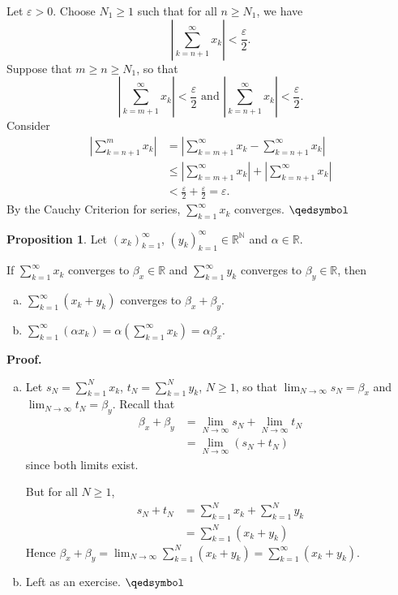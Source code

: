 \documentclass[11pt]{article}
\theoremstyle{definition}
\newtheorem{prop}[thm]{Proposition}
\newcommand{\mbN}{\ensuremath{\mathbb{N}}}
\newcommand{\mbR}{\ensuremath{\mathbb{R}}}
\begin{document}
Let $\varepsilon > 0$. Choose $N_1 \geq 1$ such that for all $n \geq N_1$, we have
$$\left| \sum_{k=n+1}^\infty x_k\right| < \frac{\varepsilon}2 \text{.}$$
Suppose that $m \geq n \geq N_1$, so that
$$\left|\sum_{k=m+1}^\infty x_k \right| < \frac{\varepsilon}2 \text{ and } \left|\sum_{k=n+1}^\infty x_k\right| < \frac{\varepsilon}2 \text{.}$$
Consider
\begin{align*}
\left| \sum_{k=n+1}^m x_k\right| 
& = \left|\sum_{k=m+1}^\infty x_k - \sum_{k=n+1}^\infty x_k\right| \\
& \leq \left|\sum_{k=m+1}^\infty x_k\right| + \left|\sum_{k=n+1}^\infty x_k\right| \\
& < \frac{\varepsilon}2 + \frac{\varepsilon}2 = \varepsilon \text{.}
\end{align*}
By the Cauchy Criterion for series, $\sum_{k=1}^\infty x_k$ converges. $\qedsymbol$

\begin{prop}
Let $(x_k)_{k=1}^\infty$, $(y_k)_{k=1}^\infty \in \mbR^{\mbN}$ and $\alpha \in \mbR$. 

If $\sum_{k=1}^\infty x_k$ converges to $\beta_x \in \mbR$ and $\sum_{k=1}^\infty y_k$ converges to $\beta_y \in \mbR$, then
\begin{enumerate}[(a)] \vspace{-0.2cm}
\item $\sum_{k=1}^\infty (x_k + y_k)$ converges to $\beta_x + \beta_y$. 
\item $\sum_{k=1}^\infty (\alpha x_k) = \alpha \left(\sum_{k=1}^\infty x_k\right) = \alpha \beta_x$.
\end{enumerate}
\end{prop}
\textbf{Proof.} 
\begin{enumerate}[(a)] \vspace{-0.2cm}
\item Let $s_N = \sum_{k=1}^N x_k$, $t_N = \sum_{k=1}^N y_k$, $N \geq 1$, so that $\lim_{N\to\infty} s_N = \beta_x$ and $\lim_{N\to\infty} t_N = \beta_y$. 
Recall that
\begin{align*}
\beta_x + \beta_y & = \lim_{N\to\infty} s_N + \lim_{N\to\infty} t_N \\
& = \lim_{N\to\infty} (s_N + t_N)
\end{align*}
since both limits exist.

But for all $N \geq 1$,
\begin{align*}
s_N + t_N & = \sum_{k=1}^N x_k + \sum_{k=1}^N y_k \\ & = \sum_{k=1}^N (x_k + y_k)
\end{align*}
Hence $\beta_x + \beta_y = \lim_{N\to\infty} \sum_{k=1}^N (x_k + y_k) = \sum_{k=1}^\infty (x_k + y_k)$.
\item Left as an exercise. $\qedsymbol$
\end{enumerate}
\end{document}
